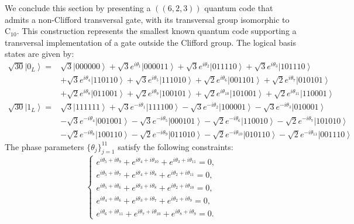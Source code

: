 \documentclass[8pt]{article}
\theoremstyle{definition}
\begin{document}
We conclude this section by presenting a \(((6,2,3))\) quantum code that admits a non-Clifford transversal gate, with its transversal group isomorphic to \(\mathrm{C}_{10}\). This construction represents the smallest known quantum code supporting a transversal implementation of a gate outside the Clifford group. The logical basis states are given by:
\begin{equation}\label{eq:623C10}
    \begin{aligned}
        \sqrt{30}\left|0_{L}\right\rangle = & \sqrt{3}\left|000000\right\rangle +\sqrt{3}e^{i\theta_{1}}\left|000011\right\rangle +\sqrt{3}e^{i\theta_{2}}\left|011110\right\rangle +\sqrt{3}e^{i\theta_{3}}\left|101110\right\rangle                       \\
                                            & +\sqrt{3}e^{i\theta_{4}}\left|110110\right\rangle +\sqrt{3}e^{i\theta_{5}}\left|111010\right\rangle +\sqrt{2}e^{i\theta_{6}}\left|001101\right\rangle +\sqrt{2}e^{i\theta_{7}}\left|010101\right\rangle       \\
                                            & +\sqrt{2}e^{i\theta_{8}}\left|011001\right\rangle +\sqrt{2}e^{i\theta_{9}}\left|100101\right\rangle +\sqrt{2}e^{i\theta_{10}}\left|101001\right\rangle +\sqrt{2}e^{i\theta_{11}}\left|110001\right\rangle     \\
        \sqrt{30}\left|1_{L}\right\rangle = & \sqrt{3}\left|111111\right\rangle +\sqrt{3}e^{-i\theta_{1}}\left|111100\right\rangle -\sqrt{3}e^{-i\theta_{2}}\left|100001\right\rangle -\sqrt{3}e^{-i\theta_{3}}\left|010001\right\rangle                    \\
                                            & -\sqrt{3}e^{-i\theta_{4}}\left|001001\right\rangle -\sqrt{3}e^{-i\theta_{5}}\left|000101\right\rangle -\sqrt{2}e^{-i\theta_{6}}\left|110010\right\rangle -\sqrt{2}e^{-i\theta_{7}}\left|101010\right\rangle   \\
                                            & -\sqrt{2}e^{-i\theta_{8}}\left|100110\right\rangle -\sqrt{2}e^{-i\theta_{9}}\left|011010\right\rangle -\sqrt{2}e^{-i\theta_{10}}\left|010110\right\rangle -\sqrt{2}e^{-i\theta_{11}}\left|001110\right\rangle
    \end{aligned}
\end{equation}
The phase parameters \(\{\theta_j\}_{j=1}^{11}\) satisfy the following constraints:
\[ \begin{cases}
        e^{i\theta_{5}+i\theta_{9}}+e^{i\theta_{4}+i\theta_{10}}+e^{i\theta_{3}+i\theta_{11}}=0, \\
        e^{i\theta_{5}+i\theta_{7}}+e^{i\theta_{4}+i\theta_{8}}+e^{i\theta_{2}+i\theta_{11}}=0,  \\
        e^{i\theta_{5}+i\theta_{6}}+e^{i\theta_{3}+i\theta_{8}}+e^{i\theta_{2}+i\theta_{10}}=0,  \\
        e^{i\theta_{4}+i\theta_{6}}+e^{i\theta_{3}+i\theta_{7}}+e^{i\theta_{2}+i\theta_{9}}=0,   \\
        e^{i\theta_{6}+i\theta_{11}}+e^{i\theta_{7}+i\theta_{10}}+e^{i\theta_{8}+i\theta_{9}}=0.
    \end{cases} \]
\end{document}
